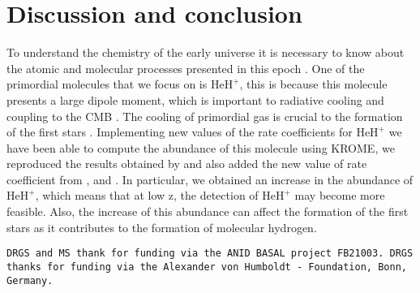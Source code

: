 \documentclass[baaa]{baaa}
\begin{document}
\section{Discussion and conclusion}
To understand the chemistry of the early universe it is necessary to know about the atomic and molecular processes presented in this epoch \citet{Bovino2011}. One of the primordial molecules that we focus on is $\mathrm{HeH^+}$, this is because this molecule presents a large dipole moment, which is important to radiative cooling and coupling to the CMB \citet{Novotny2019}. The cooling of primordial gas is crucial to the formation of the first stars \citet{Coppola2011}. 
Implementing new values of the rate coefficients for $\mathrm{HeH^+}$ we have been able to compute the abundance of this molecule using \textsc{KROME}, we reproduced the results obtained by \citet{Schleicher2008} and also added the new value of rate coefficient from \citet{Bovino2011}, \citet{Coppola2017} and \citet{Novotny2019}. In particular, we obtained an increase in the abundance of $\mathrm{HeH^+}$, which means that at low z, the detection of $\mathrm{HeH^+}$ may become more feasible. Also, the increase of this abundance can affect the formation of the first stars as it contributes to the formation of molecular hydrogen. 






\begin{acknowledgement}

\texttt{DRGS and MS thank for funding via the ANID BASAL project FB21003. DRGS thanks for funding via the  Alexander von Humboldt - Foundation, Bonn, Germany.}
\end{acknowledgement}

\small

\newpage
    
\end{document}
